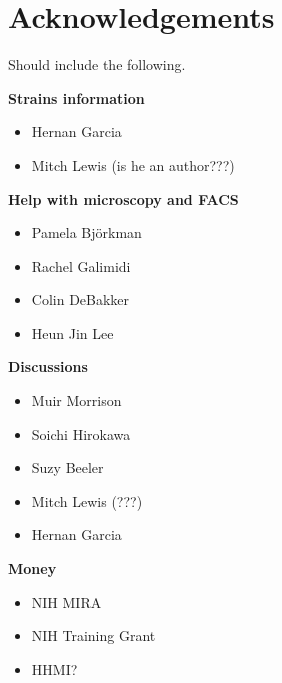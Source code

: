 \pagebreak
\section*{Acknowledgements }

Should include the following.

\textbf{Strains information}
\begin{itemize}
\item{Hernan Garcia}
\item{Mitch Lewis (is he an author???)}
\end{itemize}


\textbf{Help with microscopy and FACS}
\begin{itemize}
\item{Pamela Bj\"orkman}
\item{Rachel Galimidi}
\item{Colin DeBakker}
\item{Heun Jin Lee}
\end{itemize}

\textbf{Discussions}
\begin{itemize}
\item{Muir Morrison}
\item{Soichi Hirokawa}
\item{Suzy Beeler}
\item{Mitch Lewis (???)}
\item{Hernan Garcia}
\end{itemize}

\textbf{Money}
\begin{itemize}
\item{NIH MIRA}
\item{NIH Training Grant}
\item{HHMI?}
\end{itemize}
